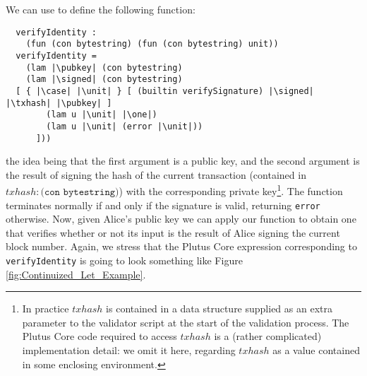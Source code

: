 \documentclass[../plutus-core-specification.tex]{subfiles}
\begin{document}
\noindent We can use \case{} to define the following function:
\begin{lstlisting}
  verifyIdentity :
    (fun (con bytestring) (fun (con bytestring) unit))
  verifyIdentity =
    (lam |\pubkey| (con bytestring)
    (lam |\signed| (con bytestring)
  [ { |\case| |\unit| } [ (builtin verifySignature) |\signed| |\txhash| |\pubkey| ]
        (lam u |\unit| |\one|)
        (lam u |\unit| (error |\unit|))
      ]))
\end{lstlisting}
the idea being that the first argument is a public key, and the second
argument is the result of signing the hash of the current transaction
(contained in $\mathit{txhash} : \texttt{(con bytestring)}$) with
the corresponding private key\footnote{In practice $\mathit{txhash}$
  is contained in a data structure supplied as an extra parameter to
  the validator script at the start of the validation process.  The
  Plutus Core code required to access $\mathit{txhash}$ is a (rather
  complicated) implementation detail: we omit it here, regarding
  $\mathit{txhash}$ as a value contained in some enclosing
  environment.}.  The function terminates normally if and only if the
signature is valid, returning \texttt{error} otherwise. Now, given
Alice's public key we can apply our function to obtain one that
verifies whether or not its input is the result of Alice signing the
current block number. Again, we stress that the Plutus Core expression
corresponding to \texttt{verifyIdentity} is going to look something
like Figure \ref{fig:Continuized_Let_Example}.



\end{document}
